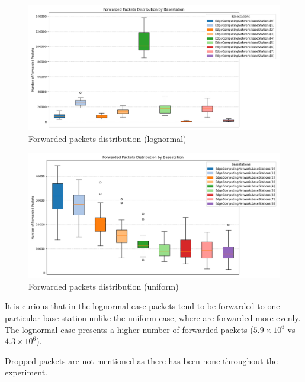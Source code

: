 \documentclass{report}
\begin{document}
\begin{figure}[H]
    \centering
    \includegraphics[width=\textwidth]{img/plots/log_1e3_B/forwarded.png}
    \caption{Forwarded packets distribution (lognormal)}
\end{figure}

\begin{figure}[H]
    \centering
    \includegraphics[width=\textwidth]{img/plots/uni_1e3_B/forwarded.png}
    \caption{Forwarded packets distribution (uniform)}
\end{figure}

\begin{flushleft}
It is curious that in the lognormal case packets tend to be forwarded to one particular base station unlike the uniform case, where are forwarded more evenly. The lognormal case presents a higher number of forwarded packets ($5.9\times10^6$ vs $4.3\times10^6$).
\vspace{1em}

Dropped packets are not mentioned as there has been none throughout the experiment.
\end{flushleft}
\end{document}
